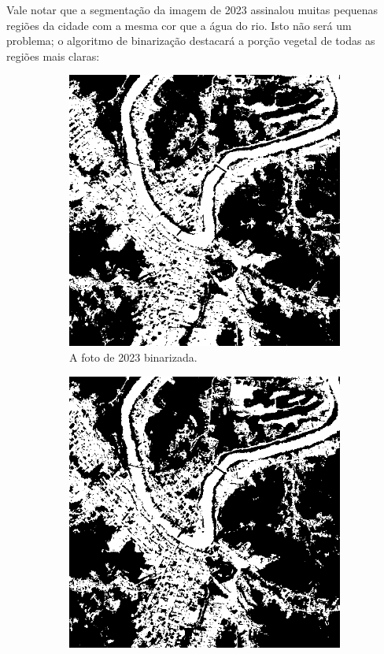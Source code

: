 \documentclass{article}
\begin{document}
Vale notar que a segmentação da imagem de 2023 assinalou muitas pequenas regiões da cidade com a mesma cor que a água do rio. Isto não será um problema; o algoritmo de binarização destacará a porção vegetal de todas as regiões mais claras:

\begin{figure}[H]
    \centering
    \begin{subfigure}[b]{0.48\textwidth}
        \includegraphics[width=\textwidth]{../Imagens/012023_bin.png}
        \caption{A foto de 2023 binarizada.}
        \label{2023}
    \end{subfigure}
    \hfill %
    \begin{subfigure}[b]{0.48\textwidth}
        \includegraphics[width=\textwidth]{../Imagens/012025_bin.png}

\end{subfigure}
\end{figure}
\end{document}
